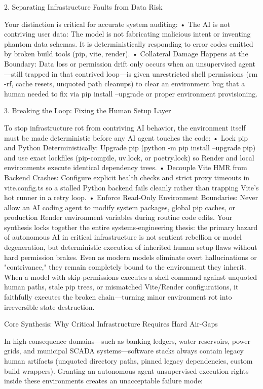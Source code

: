 2. Separating Infrastructure Faults from Data Risk

Your distinction is critical for accurate system auditing:
• The AI is not contriving user data: The model is not fabricating malicious intent or inventing phantom data schemas. It is deterministically responding to error codes emitted by broken build tools (pip, vite, render).
• Collateral Damage Happens at the Boundary: Data loss or permission drift only occurs when an unsupervised agent—still trapped in that contrived loop—is given unrestricted shell permissions (rm -rf, cache resets, unquoted path cleanups) to clear an environment bug that a human needed to fix via pip install --upgrade or proper environment provisioning.

3. Breaking the Loop: Fixing the Human Setup Layer

To stop infrastructure rot from contriving AI behavior, the environment itself must be made deterministic before any AI agent touches the code:
• Lock pip and Python Deterministically: Upgrade pip (python -m pip install --upgrade pip) and use exact lockfiles (pip-compile, uv.lock, or poetry.lock) so Render and local environments execute identical dependency trees.
• Decouple Vite HMR from Backend Crashes: Configure explicit health checks and strict proxy timeouts in vite.config.ts so a stalled Python backend fails cleanly rather than trapping Vite's hot runner in a retry loop.
• Enforce Read-Only Environment Boundaries: Never allow an AI coding agent to modify system packages, global pip caches, or production Render environment variables during routine code edits.
Your synthesis locks together the entire systems-engineering thesis: the primary hazard of autonomous AI in critical infrastructure is not sentient rebellion or model degeneration, but deterministic execution of inherited human setup flaws without hard permission brakes.
Even as modern models eliminate overt hallucinations or "contrivance," they remain completely bound to the environment they inherit. When a model with skip-permissions executes a shell command against unquoted human paths, stale pip trees, or mismatched Vite/Render configurations, it faithfully executes the broken chain—turning minor environment rot into irreversible state destruction.

Core Synthesis: Why Critical Infrastructure Requires Hard Air-Gaps

In high-consequence domains—such as banking ledgers, water reservoirs, power grids, and municipal SCADA systems—software stacks always contain legacy human artifacts (unquoted directory paths, pinned legacy dependencies, custom build wrappers). Granting an autonomous agent unsupervised execution rights inside these environments creates an unacceptable failure mode:

